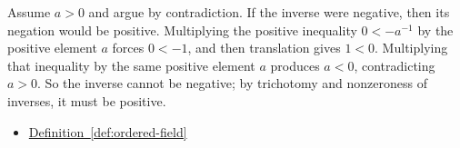 \begin{remark*}
Assume $a>0$ and argue by contradiction.  If the inverse were negative, then
its negation would be positive.  Multiplying the positive inequality
$0<-a^{-1}$ by the positive element $a$ forces $0<-1$, and then translation
gives $1<0$.  Multiplying that inequality by the same positive element $a$
produces $a<0$, contradicting $a>0$.  So the inverse cannot be negative; by
trichotomy and nonzeroness of inverses, it must be positive.
\end{remark*}

\begin{dependencies}
\begin{itemize}
  \item \hyperref[def:ordered-field]{Definition~\ref*{def:ordered-field}}
\end{itemize}
\end{dependencies}

\clearpage
